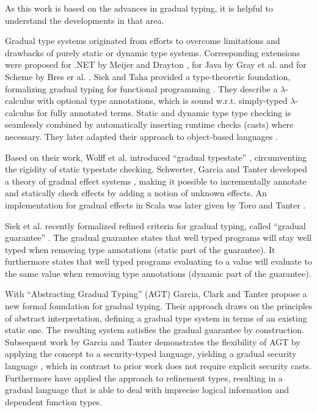 As this work is based on the advances in gradual typing, it is helpful to understand the developments in that area.

Gradual type systems originated from efforts to overcome limitations and drawbacks of purely static or dynamic type systems.
Corresponding extensions were proposed for .NET by Meijer and Drayton \cite{meijer2004static}, for Java by Gray et al. \cite{gray2005fine} and for Scheme by Bres er al. \cite{bres2004compiling}.
Siek and Taha provided a type-theoretic foundation, formalizing gradual typing for functional programming \cite{siek2006gradual}.
They describe a $\lambda$-calculus with optional type annotations, which is sound w.r.t. simply-typed $\lambda$-calculus for fully annotated terms.
Static and dynamic type type checking is seamlessly combined by automatically inserting runtime checks (casts) where necessary.
They later adapted their approach to object-based languages \cite{siek2007gradual}.

Based on their work, Wolff et al. introduced “gradual typestate” \cite{wolff2011gradual}, circumventing the rigidity of static typestate checking.
Schwerter, Garcia and Tanter developed a theory of gradual effect systems \cite{banados2014theory}, making it possible to incrementally annotate and statically check effects by adding a notion of unknown effects.
An implementation for gradual effects in Scala was later given by Toro and Tanter \cite{toro2015customizable}.

\label{grad-guarantee}
Siek et al. recently formalized refined criteria for gradual typing, called “gradual guarantee” \cite{siek2015refined}.
The gradual guarantee states that well typed programs will stay well typed when removing type annotations (static part of the guarantee).
It furthermore states that well typed programs evaluating to a value will evaluate to the same value when removing type annotations (dynamic part of the guarantee).

With “Abstracting Gradual Typing” (AGT) \cite{garcia2016abstracting} Garcia, Clark and Tanter propose a new formal foundation for gradual typing.
Their approach draws on the principles of abstract interpretation, defining a gradual type system in terms of an existing static one.
The resulting system satisfies the gradual guarantee by construction.
Subsequent work by Garcia and Tanter demonstrates the flexibility of AGT by applying the concept to a security-typed language, yielding a gradual security language \cite{garcia2015deriving}, which in contrast to prior work does not require explicit security casts.
Furthermore \cite{nico} have applied the approach to refinement types, resulting in a gradual language that is able to deal with imprecise logical information and dependent function types.
